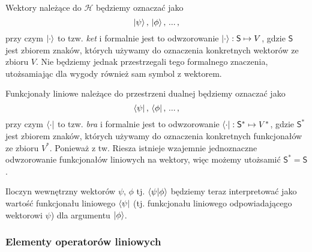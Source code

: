 \documentclass{myclass}
\begin{document}
Wektory należące do \(\mathscr{H}\) będziemy oznaczać jako
\begin{equation*}
    \ket{\psi},\, \ket{\phi},\, ...\,,
\end{equation*}
przy czym \(\ket{\cdot}\) to tzw. \textit{ket} i formalnie jest to odwzorowanie \(\ket{\cdot} :
\mathsf{S} \mapsto V\), gdzie \(\mathsf{S}\) jest zbiorem znaków, których używamy do oznaczenia
konkretnych wektorów ze zbioru \(V\). Nie będziemy jednak przestrzegali tego formalnego znaczenia,
utożsamiając dla wygody również  sam symbol z wektorem.

Funkcjonały liniowe należące do przestrzeni dualnej będziemy oznaczać jako
\begin{equation*}
    \bra{\psi},\, \bra{\phi},\, ...\,,
\end{equation*}
przy czym \(\bra{\cdot}\) to tzw. \textit{bra} i formalnie jest to odwzorowanie \(\bra{\cdot} :
\mathsf{S}^* \mapsto V^*\), gdzie \(\mathsf{S}^*\) jest zbiorem znaków, których używamy do
oznaczenia konkretnych funkcjonałów ze zbioru \(V^*\). Ponieważ z tw. Riesza istnieje wzajemnie
jednoznaczne odwzorowanie funkcjonałów liniowych na wektory, więc możemy utożsamić \(\mathsf{S}^* =
\mathsf{S}\). 

Iloczyn wewnętrzny wektorów \(\psi\), \(\phi\) tj. \(\braket{\psi}{\phi}\) będziemy teraz
interpretować jako wartość funkcjonału liniowego \(\bra{\psi}\) (tj. funkcjonału liniowego
odpowiadającego wektorowi \(\psi\)) dla argumentu \(\ket{\phi}\).

\subsubsection{Elementy operatorów liniowych}
\end{document}
